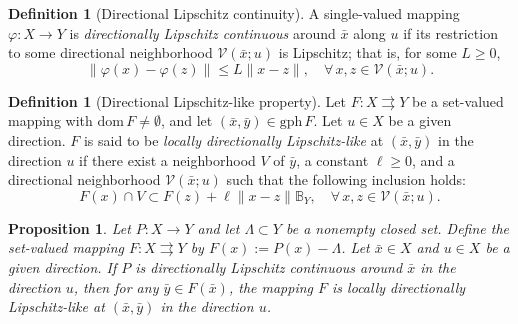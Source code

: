 \documentclass[12pt,twoside,reqno]{amsart}
\newtheorem{proposition}[theorem]{Proposition}
\theoremstyle{definition}
\newtheorem{definition}[theorem]{Definition}
\numberwithin{equation}{section}
\begin{document}
\begin{definition}[Directional Lipschitz continuity] \label{def:directional_lipschitz_single}
    A single-valued mapping $\varphi:X\to Y$ is \emph{directionally Lipschitz continuous} around $\bar{x}$ along $u$ if its restriction to some directional neighborhood $\mathcal{V}(\bar{x};u)$ is Lipschitz; that is, for some $L\geq0$,
    \begin{equation*}
        \|\varphi(x) - \varphi(z)\| \leq L \|x - z\|, \quad \forall\, x, z \in \mathcal{V}(\bar{x}; u).
    \end{equation*}
\end{definition}

\begin{definition}[Directional Lipschitz-like property] \label{def:directional_lipschitz_set}
    Let $F: X \rightrightarrows Y$ be a set-valued mapping with $\mathrm{dom}\, F \neq \emptyset$, and let $(\bar{x}, \bar{y}) \in \mathrm{gph}\, F$. Let $u \in X$ be a given direction. $F$ is said to be \emph{locally directionally Lipschitz-like} at $(\bar{x}, \bar{y})$ in the direction $u$ if there exist a neighborhood $V$ of $\bar{y}$, a constant $\ell \ge 0$, and a directional neighborhood $\mathcal{V}(\bar{x}; u)$ such that the following inclusion holds:
    \begin{equation} \label{eq:directional_lipschitz_inclusion}
        F(x) \cap V \subset F(z) + \ell \|x - z\| \mathbb{B}_Y, \quad \forall\, x, z \in \mathcal{V}(\bar{x}; u). 
    \end{equation}
\end{definition}

\begin{proposition} \label{prop:lipschitz_implication}
    Let $P: X \to Y$ and let $\Lambda \subset Y$ be a nonempty closed set. Define the set-valued mapping $F: X \rightrightarrows Y$ by $F(x) := P(x) - \Lambda$. Let $\bar{x} \in X$ and $u \in X$ be a given direction. If $P$ is directionally Lipschitz continuous around $\bar{x}$ in the direction $u$, then for any $\bar{y} \in F(\bar{x})$, the mapping $F$ is locally directionally Lipschitz-like at $(\bar{x}, \bar{y})$ in the direction $u$.
\end{proposition}
\end{document}
